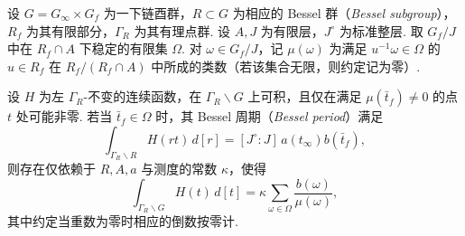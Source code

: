 \begin{lemma}
\label{lem:a-seesaw-cut-integral}
\emitthmsource
设 $G=G_\infty\times G_f$ 为一下链酉群，$R\subset G$ 为相应的 Bessel 群（\emph{Bessel subgroup}），$R_f$ 为其有限部分，$\Gamma_R$ 为其有理点群. 设 $A,J$ 为有限层，$J^\circ$ 为标准整层. 取 $G_f/J$ 中在 $R_f\cap A$ 下稳定的有限集 $\Omega$. 对 $\omega\in G_f/J$，记 $\mu(\omega)$ 为满足 $u^{-1}\omega\in\Omega$ 的 $u\in R_f$ 在 $R_f/(R_f\cap A)$ 中所成的类数（若该集合无限，则约定记为零）.

设 $H$ 为左 $\Gamma_R$-不变的连续函数，在 $\Gamma_R\backslash G$ 上可积，且仅在满足 $\mu(\bar t_f)\ne0$ 的点 $t$ 处可能非零. 若当 $\bar t_f\in\Omega$ 时，其 Bessel 周期（\emph{Bessel period}）满足
\[
 \int_{\Gamma_R\backslash R}H(rt)\,d[r]
     =[J^\circ:J]\, a(t_\infty)b(\bar t_f),
\]
则存在仅依赖于 $R,A,a$ 与测度的常数 $\kappa$，使得
\[
 \int_{\Gamma_R\backslash G} H(t)\,d[t]
   =\kappa\sum_{\omega\in\Omega}\frac{b(\omega)}{\mu(\omega)} ,
\]
其中约定当重数为零时相应的倒数按零计.
\end{lemma}
